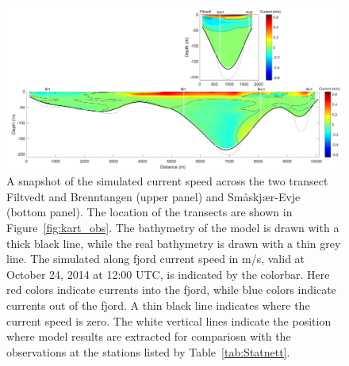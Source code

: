 \begin{figure}[ht]
	\centerline{
		\includegraphics*[trim=0 0 0 0,clip=true,width=\textwidth]{Figurer/AndreS/Two_transectas_cur}}
	\caption{\small A snapshot of the simulated current speed across the two transect Filtvedt and Brenntangen (upper panel) and Sm{\aa}skj{\ae}r-Evje (bottom panel). The location of the transects are shown in Figure~\ref{fig:kart_obs}. The bathymetry of the model is drawn with a thick black line, while the real bathymetry is drawn with a thin grey line. The simulated along fjord current speed in m/s, valid at October 24, 2014 at 12:00 UTC, is indicated by the colorbar. Here red colors indicate currents into the fjord, while blue colors indicate currents out of the fjord. A thin black line indicates where the current speed is zero. The white vertical lines indicate the position where model results are extracted for compariosn with the observations at the stations listed by Table~\ref{tab:Statnett}.}
	\label{fig:Two_transect}
\end{figure}

